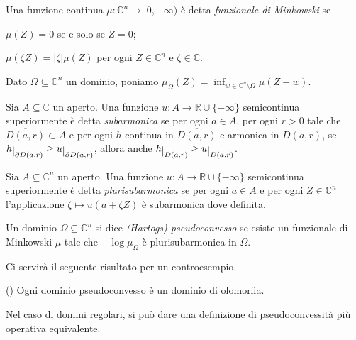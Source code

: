 \begin{defn}
    Una funzione continua $\mu:\mathbb{C}^n \longrightarrow [0,+\infty)$ è detta \textit{funzionale di Minkowski} se
    \begin{nlist}
        \item $\mu(Z)=0$ se e solo se $Z=0$;
        \item $\mu(\zeta Z)=|\zeta|\mu(Z)$ per ogni $Z \in \mathbb{C}^n$ e $\zeta\in\mathbb{C}$.
    \end{nlist}
    Dato $\Omega\subseteq\mathbb{C}^n$ un dominio, poniamo $\mu_{\Omega}(Z)=\inf_{w\in\mathbb{C}^n\setminus\Omega}\mu(Z-w)$.
\end{defn}

\begin{defn}
    Sia $A\subseteq\mathbb{C}$ un aperto. Una funzione $u:A \longrightarrow \mathbb{R}\cup\{-\infty\}$ semicontinua superiormente è detta \textit{subarmonica} se per ogni $a \in A$, per ogni $r>0$ tale che $\overline{D(a,r)} \subset A$ e per ogni $h$ continua in $\overline{D(a,r)}$ e armonica in $D(a,r)$, se $h\restrict{\partial D(a,r)} \ge u\restrict{\partial D(a,r)}$, allora anche $h\restrict{D(a,r)} \ge u \restrict{D(a,r)}$.

    Sia $A\subseteq\mathbb{C}^n$ un aperto. Una funzione $u:A \longrightarrow \mathbb{R}\cup\{-\infty\}$ semicontinua superiormente è detta \textit{plurisubarmonica} se per ogni $a \in A$ e per ogni $Z \in \mathbb{C}^n$ l'applicazione $\zeta \longmapsto u(a+\zeta Z)$ è subarmonica dove definita.
\end{defn}

\begin{defn}
    Un dominio $\Omega \subseteq \mathbb{C}^n$ si dice \textit{(Hartogs) pseudoconvesso} se esiste un funzionale di Minkowski $\mu$ tale che $-\log\mu_{\Omega}$ è plurisubarmonica in $\Omega$.
\end{defn}

 Ci servirà il seguente risultato per un controesempio.
 \begin{thm}
    (\cite[Chapter 5, Paragraph 5.1, Theorem 5.1.2]{Kr}) Ogni dominio pseudoconvesso è un dominio di olomorfia.
 \end{thm}

Nel caso di domini regolari, si può dare una definizione di pseudoconvessità più operativa equivalente.

